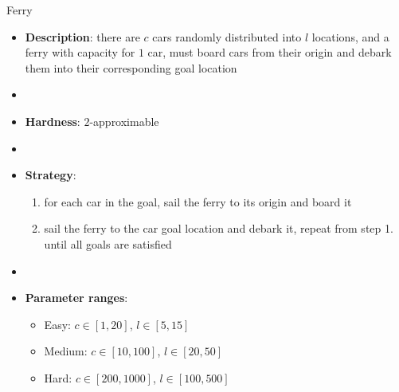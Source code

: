 \documentclass[aspectratio=169,xcolor=dvipsnames]{beamer}
\begin{document}
\begin{frame}{Ferry}

    \begin{itemize}
        \item \textbf{Description}: there are $c$ cars randomly distributed into $l$ locations, and a ferry with capacity for $1$ car, must board cars from their origin and debark them into their corresponding goal location
        \item[]
        \item \textbf{Hardness}: $2$-approximable %
        \item[]
        \item \textbf{Strategy}:
        \begin{enumerate}
            \item for each car in the goal, sail the ferry to its origin and board it
            \item sail the ferry to the car goal location and debark it, repeat from step 1. until all goals are satisfied
        \end{enumerate}
        \item[]
        \item \textbf{Parameter ranges}:
        \begin{itemize}
            \item Easy: $c\in[1, 20]$, $l \in [5, 15]$
            \item Medium: $c\in[10, 100]$, $l \in [20, 50]$
            \item Hard: $c\in[200, 1000]$, $l \in [100, 500]$
        \end{itemize}
    \end{itemize}

\end{frame}
\end{document}
